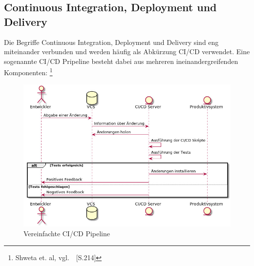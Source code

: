 \newpage
\subsection{Continuous Integration, Deployment und Delivery}\label{continouous_whatever}

Die Begriffe Continuous Integration, Deployment und Delivery sind eng miteinander verbunden und werden häufig als Abkürzung CI/CD verwendet.
Eine sogenannte CI/CD Pripeline besteht dabei aus mehreren ineinandergreifenden Komponenten: \footnote{Shweta et. al, vgl.~\cite{Shweta2014}~[S.214]} \\

\begin{figure}[htb]
    \centering
    \includegraphics[width=1.0\textwidth]{images/cicd_pipeline.jpg}
    \caption[Vereinfachte CI/CD Pipeline]{Vereinfachte CI/CD Pipeline}
    \label{fig:Vereinfachte CI/CD Pipeline}
\end{figure}




